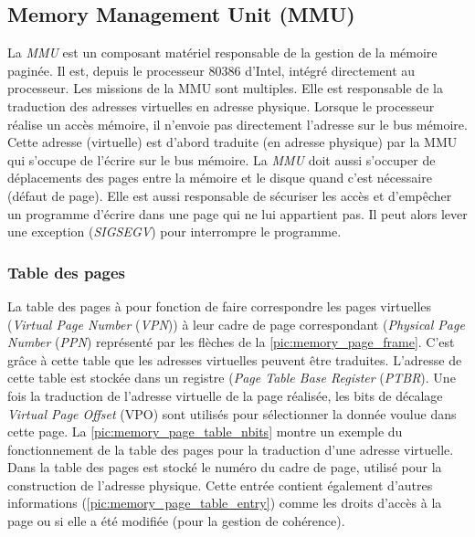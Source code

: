 \subsection{Memory Management Unit (MMU)} \label{sec:mmu}
La \textit{MMU} est un composant matériel responsable de la gestion de la mémoire paginée. Il est, depuis le processeur 80386 d'Intel, intégré directement au processeur. Les missions de la MMU sont multiples. Elle est responsable de la traduction des adresses virtuelles en adresse physique. Lorsque le processeur réalise un accès mémoire, il n'envoie pas directement l'adresse sur le bus mémoire. Cette adresse (virtuelle) est d'abord traduite (en adresse physique) par la MMU qui s'occupe de l'écrire sur le bus mémoire. La \textit{MMU} doit aussi s'occuper de déplacements des pages entre la mémoire et le disque quand c'est nécessaire (défaut de page). Elle est aussi responsable de sécuriser les accès et d'empêcher un programme d'écrire dans une page qui ne lui appartient pas. Il peut alors lever une exception (\textit{SIGSEGV}) pour interrompre le programme. 

\subsubsection{Table des pages} \label{sec:table_page}

La table des pages à pour fonction de faire correspondre les pages virtuelles (\textit{Virtual Page Number} (\textit{VPN})) à leur cadre de page correspondant (\textit{Physical Page Number} (\textit{PPN}) représenté par les flèches de la \autoref{pic:memory_page_frame}. C'est grâce à cette table que les adresses virtuelles peuvent être traduites. L'adresse de cette table est stockée dans un registre (\textit{Page Table Base Register} (\textit{PTBR}). Une fois la traduction de l'adresse virtuelle de la page réalisée, les bits de décalage \textit{Virtual Page Offset} (VPO) sont utilisés pour sélectionner la donnée voulue dans cette page. La \autoref{pic:memory_page_table_nbits} montre un exemple du fonctionnement de la table des pages pour la traduction d'une adresse virtuelle. Dans la table des pages est stocké le numéro du cadre de page, utilisé pour la construction de l'adresse physique. Cette entrée contient également d'autres informations (\autoref{pic:memory_page_table_entry}) comme les droits d'accès à la page ou si elle a été modifiée (pour la gestion de cohérence).



